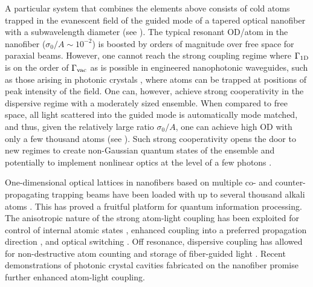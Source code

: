 \documentclass[aps,pra,twocolumn]{revtex4-1} %
\newcommand{\oneD}{{\rm 1D}}
\newcommand{\vac}{{\rm vac}}
\begin{document}
A particular system that combines the elements above consists of cold atoms trapped in the evanescent field of the guided mode of a tapered optical nanofiber with a subwavelength diameter \cite{vetsch_optical_2010, lacroute_state-insensitive_2012, balykin_quantum_2014, grover_photon-correlation_2015} (see ).  
The typical resonant OD/atom in the nanofiber ($\sigma_0/A \sim  10^{-2}$) is boosted by orders of magnitude over free space for paraxial beams. 
However, one cannot reach the strong coupling regime where $\Gamma_{\oneD}$ is on the order of $\Gamma_{\vac}$ as is possible in engineered nanophotonic waveguides, such as those arising in photonic crystals \cite{hung_trapped_2013}, where atoms can be trapped at positions of peak intensity of the field.  
One can, however, achieve strong cooperativity in the dispersive regime with a moderately sized ensemble.  When compared to free space, all light scattered into the guided mode is automatically mode matched, and thus, given the relatively large ratio $\sigma_0/A$, one can achieve high OD with only a few thousand atoms (see ).  
Such strong cooperativity opens the door to new regimes to create non-Gaussian quantum states of the ensemble \cite{dubost_efficient_2012} and potentially to implement nonlinear optics at the level of a few photons \cite{spillane_observation_2008, pittman_ultralow-power_2013, oshea_fiber-optical_2013}.


One-dimensional optical lattices in nanofibers based on multiple co- and counter-propagating trapping beams have been loaded with up to several thousand alkali atoms \cite{vetsch_optical_2010, lacroute_state-insensitive_2012}.
This has proved a fruitful platform for quantum information processing.  
The anisotropic nature of the strong atom-light coupling has been exploited for control of internal atomic states \cite{mitsch_exploiting_2014}, enhanced coupling into a preferred propagation direction \cite{petersen_chiral_2014, mitsch_quantum_2014}, and optical switching \cite{oshea_fiber-optical_2013}. 
Off resonance, dispersive coupling has allowed for non-destructive atom counting \cite{dawkins_dispersive_2011, beguin_generation_2014} 
and storage of fiber-guided light \cite{gouraud_demonstration_2015, sayrin_storage_2015}.
Recent demonstrations of photonic crystal cavities fabricated on the nanofiber \cite{wuttke_nanofiber_2012, nayak_optical_2014, schell_highly_2015} promise further enhanced atom-light coupling.
\end{document}
